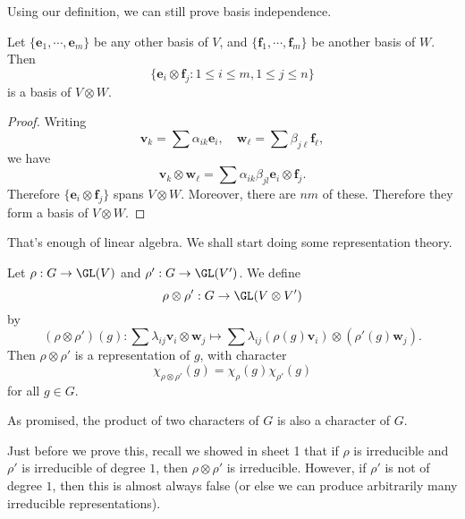 \documentclass[a4paper]{article}
\begin{document}
Using our definition, we can still prove basis independence.
\begin{lemma}
  Let $\{\mathbf{e}_1, \cdots, \mathbf{e}_m\}$ be any other basis of $V$, and $\{\mathbf{f}_1, \cdots, \mathbf{f}_m\}$ be another basis of $W$. Then
  \[
    \{\mathbf{e}_i \otimes \mathbf{f}_j: 1 \leq i \leq m, 1 \leq j \leq n\}
  \]
  is a basis of $V\otimes W$.
\end{lemma}

\begin{proof}
  Writing
  \[
    \mathbf{v}_k = \sum \alpha_{ik} \mathbf{e}_i,\quad \mathbf{w}_\ell = \sum \beta_{j\ell} \mathbf{f}_\ell,
  \]
  we have
  \[
    \mathbf{v}_k \otimes \mathbf{w}_\ell = \sum \alpha_{ik} \beta_{jl} \mathbf{e}_i \otimes \mathbf{f}_j.
  \]
  Therefore $\{\mathbf{e}_i \otimes \mathbf{f}_j\}$ spans $V \otimes W$. Moreover, there are $nm$ of these. Therefore they form a basis of $V\otimes W$.
\end{proof}

That's enough of linear algebra. We shall start doing some representation theory.
\begin{prop}
  Let $\rho: G \to \GL(V)$ and $\rho': G \to \GL(V')$. We define
  \[
    \rho \otimes \rho': G \to \GL(V\otimes V')
  \]
  by
  \[
    (\rho \otimes \rho')(g) : \sum \lambda_{ij} \mathbf{v}_i \otimes \mathbf{w}_j \mapsto \sum \lambda_{ij} (\rho(g)\mathbf{v}_i)\otimes (\rho'(g) \mathbf{w}_j).
  \]
  Then $\rho \otimes \rho'$ is a representation of $g$, with character
  \[
    \chi_{\rho\otimes \rho'}(g) = \chi_\rho(g) \chi_{\rho'}(g)
  \]
  for all $g \in G$.
\end{prop}
As promised, the product of two characters of $G$ is also a character of $G$.

Just before we prove this, recall we showed in sheet 1 that if $\rho$ is irreducible and $\rho'$ is irreducible of degree $1$, then $\rho \otimes \rho'$ is irreducible. However, if $\rho'$ is not of degree $1$, then this is almost always false (or else we can produce arbitrarily many irreducible representations).
\end{document}
